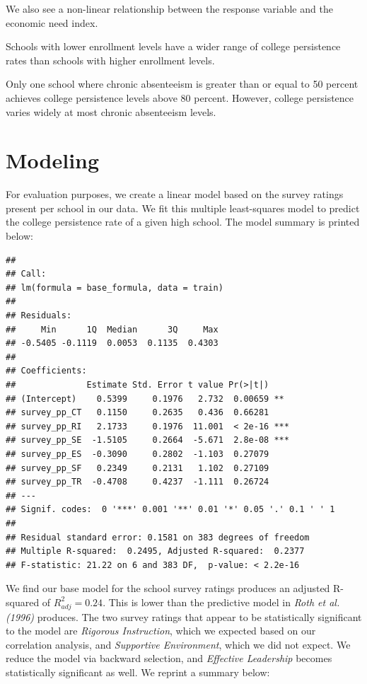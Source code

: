 \documentclass[
  man,floatsintext]{apa6}
\begin{document}
We also see a non-linear relationship between the response variable and the economic need index.

Schools with lower enrollment levels have a wider range of college persistence rates than schools with higher enrollment levels.

Only one school where chronic absenteeism is greater than or equal to 50 percent achieves college persistence levels above 80 percent. However, college persistence varies widely at most chronic absenteeism levels.

\hypertarget{modeling}{%
\section{Modeling}\label{modeling}}

For evaluation purposes, we create a linear model based on the survey ratings present per school in our data. We fit this multiple least-squares model to predict the college persistence rate of a given high school. The model summary is printed below:

\begin{verbatim}
## 
## Call:
## lm(formula = base_formula, data = train)
## 
## Residuals:
##     Min      1Q  Median      3Q     Max 
## -0.5405 -0.1119  0.0053  0.1135  0.4303 
## 
## Coefficients:
##              Estimate Std. Error t value Pr(>|t|)    
## (Intercept)    0.5399     0.1976   2.732  0.00659 ** 
## survey_pp_CT   0.1150     0.2635   0.436  0.66281    
## survey_pp_RI   2.1733     0.1976  11.001  < 2e-16 ***
## survey_pp_SE  -1.5105     0.2664  -5.671  2.8e-08 ***
## survey_pp_ES  -0.3090     0.2802  -1.103  0.27079    
## survey_pp_SF   0.2349     0.2131   1.102  0.27109    
## survey_pp_TR  -0.4708     0.4237  -1.111  0.26724    
## ---
## Signif. codes:  0 '***' 0.001 '**' 0.01 '*' 0.05 '.' 0.1 ' ' 1
## 
## Residual standard error: 0.1581 on 383 degrees of freedom
## Multiple R-squared:  0.2495, Adjusted R-squared:  0.2377 
## F-statistic: 21.22 on 6 and 383 DF,  p-value: < 2.2e-16
\end{verbatim}

We find our base model for the school survey ratings produces an adjusted R-squared of \(R^2_{adj} = 0.24\). This is lower than the predictive model in \emph{Roth et al. (1996)} produces. The two survey ratings that appear to be statistically significant to the model are \emph{Rigorous Instruction}, which we expected based on our correlation analysis, and \emph{Supportive Environment}, which we did not expect. We reduce the model via backward selection, and \emph{Effective Leadership} becomes statistically significant as well. We reprint a summary below:
\end{document}
